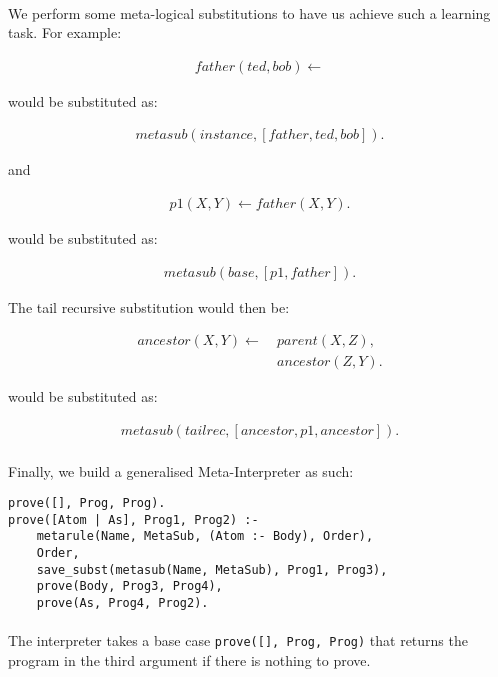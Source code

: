 \documentclass{article}
\theoremstyle{plain}
\theoremstyle{definition}
\begin{document}
\begin{multicols}{2}
\paragraph{} We perform some meta-logical substitutions to have us achieve such a learning task. For example:

\begin{align*}
father(ted, bob) \leftarrow
\end{align*}

would be substituted as:

\begin{align*}
metasub(instance, [father, ted, bob]).
\end{align*}

and

\begin{align*}
p1(X, Y) \leftarrow father(X, Y).
\end{align*}

would be substituted as:

\begin{align*}
metasub(base, [p1, father]).
\end{align*}

The tail recursive substitution would then be:

\begin{align*}
ancestor(X, Y) \leftarrow\ &parent(X, Z),\\ &ancestor(Z, Y).
\end{align*}

would be substituted as:

\begin{align*}
metasub(tailrec, [ancestor, p1, ancestor]).
\end{align*}

\paragraph{} Finally, we build a generalised Meta-Interpreter as such:

\begin{lstlisting}
prove([], Prog, Prog).
prove([Atom | As], Prog1, Prog2) :-
	metarule(Name, MetaSub, (Atom :- Body), Order),
	Order,
	save_subst(metasub(Name, MetaSub), Prog1, Prog3),
	prove(Body, Prog3, Prog4),
	prove(As, Prog4, Prog2).
\end{lstlisting}

\paragraph{} The interpreter takes a base case \lstinline{prove([], Prog, Prog)} that returns the program in the third argument if there is nothing to prove.


\end{multicols}
\end{document}
